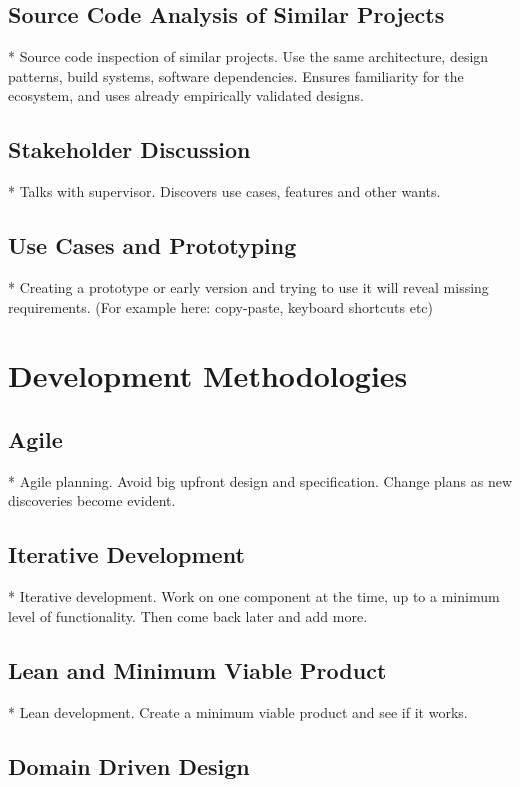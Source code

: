 \subsection{Source Code Analysis of Similar Projects}
* Source code inspection of similar projects. Use the same architecture, design patterns, build systems, software dependencies. Ensures familiarity for the ecosystem, and uses already empirically validated designs.

\subsection{Stakeholder Discussion}

* Talks with supervisor. Discovers use cases, features and other wants.

\subsection{Use Cases and Prototyping}

* Creating a prototype or early version and trying to use it will reveal missing requirements. (For example here: copy-paste, keyboard shortcuts etc)

\section{Development Methodologies}

\subsection{Agile}

* Agile planning. Avoid big upfront design and specification. Change plans as new discoveries become evident.

\subsection{Iterative Development}
* Iterative development. Work on one component at the time, up to a minimum level of functionality. Then come back later and add more.


\subsection{Lean and Minimum Viable Product}

* Lean development. Create a minimum viable product and see if it works.

\subsection{Domain Driven Design}

